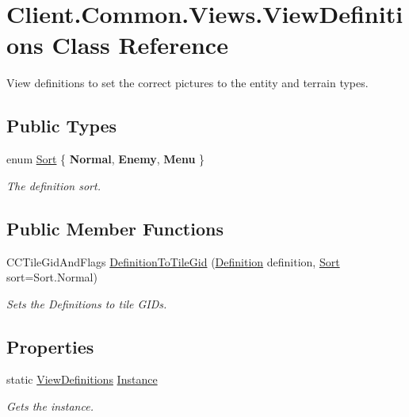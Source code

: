 \hypertarget{classClient_1_1Common_1_1Views_1_1ViewDefinitions}{}\section{Client.\+Common.\+Views.\+View\+Definitions Class Reference}
\label{classClient_1_1Common_1_1Views_1_1ViewDefinitions}


View definitions to set the correct pictures to the entity and terrain types.  


\subsection*{Public Types}
\begin{DoxyCompactItemize}
\item 
enum \hyperlink{classClient_1_1Common_1_1Views_1_1ViewDefinitions_a098bd83f9fc1d617dc8f358298b3a883}{Sort} \{ {\bfseries Normal}, 
{\bfseries Enemy}, 
{\bfseries Menu}
 \}\begin{DoxyCompactList}\small\item\em The definition sort. \end{DoxyCompactList}
\end{DoxyCompactItemize}
\subsection*{Public Member Functions}
\begin{DoxyCompactItemize}
\item 
C\+C\+Tile\+Gid\+And\+Flags \hyperlink{classClient_1_1Common_1_1Views_1_1ViewDefinitions_a2d57e9609ebd206365dca478851ce638}{Definition\+To\+Tile\+Gid} (\hyperlink{classCore_1_1Models_1_1Definitions_1_1Definition}{Definition} definition, \hyperlink{classClient_1_1Common_1_1Views_1_1ViewDefinitions_a098bd83f9fc1d617dc8f358298b3a883}{Sort} sort=Sort.\+Normal)
\begin{DoxyCompactList}\small\item\em Sets the Definitions to tile G\+I\+Ds. \end{DoxyCompactList}\end{DoxyCompactItemize}
\subsection*{Properties}
\begin{DoxyCompactItemize}
\item 
static \hyperlink{classClient_1_1Common_1_1Views_1_1ViewDefinitions}{View\+Definitions} \hyperlink{classClient_1_1Common_1_1Views_1_1ViewDefinitions_a50a6b5a1d17e54b4de44ab983b8d4810}{Instance}
\begin{DoxyCompactList}\small\item\em Gets the instance. \end{DoxyCompactList}\end{DoxyCompactItemize}


